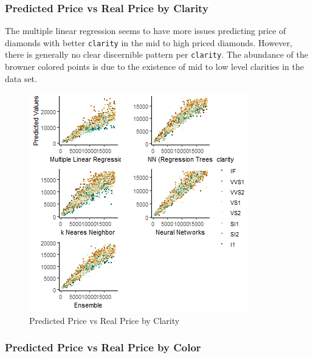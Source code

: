 \documentclass[
  paper=a4,
  ,captions=tableheading
]{scrartcl}
\begin{document}
\hypertarget{predicted-price-vs-real-price-by-clarity}{%
\subsubsection{Predicted Price vs Real Price by
Clarity}\label{predicted-price-vs-real-price-by-clarity}}

The multiple linear regression seems to have more issues predicting
price of diamonds with better \texttt{clarity} in the mid to high priced
diamonds. However, there is generally no clear discernible pattern per
\texttt{clarity}. The abundance of the browner colored points is due to
the existence of mid to low level clarities in the data set.

\begin{figure}[H]

{\centering \includegraphics[width=\linewidth,]{Diamonds_PDF_files/figure-latex/Ensemble Summary Plot-1} 

}

\caption{Predicted Price vs Real Price by Clarity}\label{fig:Ensemble Summary Plot}
\end{figure}

\newpage

\hypertarget{predicted-price-vs-real-price-by-color}{%
\subsubsection{Predicted Price vs Real Price by
Color}\label{predicted-price-vs-real-price-by-color}}
\end{document}
